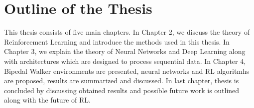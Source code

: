 \section{Outline of the Thesis}
\label{sec:outline}
This thesis consists of five main chapters. 
In Chapter 2, we discuss the theory of Reinforcement Learning and introduce the methods used in this thesis.
In Chapter 3, we explain the theory of Neural Networks and Deep Learning along with architectures which are designed to process sequential data. 
In Chapter 4, Bipedal Walker environments are presented, neural networks and RL algoritmhs are proposed, results are summarized and discussed.
In last chapter, thesis is concluded by discussing obtained results and possible future work is outlined along with the future of RL.
